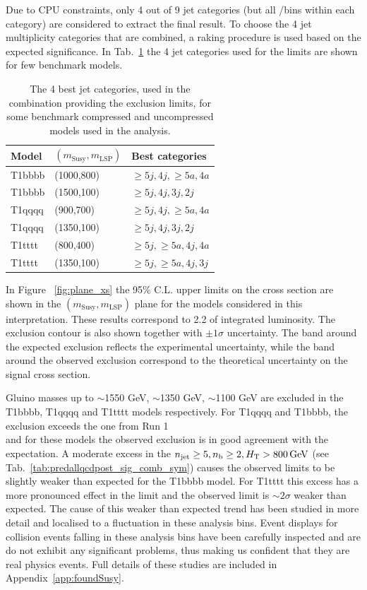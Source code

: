 Due to CPU constraints, only 4 out of 9 jet categories (but all \nb/\scalht bins
within each category) are considered to extract the final result. 
To choose the 4 jet multiplicity categories that are combined, a raking procedure 
is used based on the expected significance. 
In Tab.~\ref{tab:sig-bestCats} the 4 jet categories used for the limits are shown for few benchmark models. 

\begin{table}[h!]
  \caption{
    The 4 best jet categories, used in the combination providing the exclusion limits, 
    for some benchmark compressed and uncompressed models used in the analysis.
  }
  \label{tab:sig-bestCats}
  \centering
  \begin{tabular}{ lll }
    \hline
    \hline
    Model & $(m_{\mathrm{Susy}},m_{\mathrm{LSP}})$ & Best categories \\ 
    \hline
    T1bbbb & (1000,800) & $\geq5j,4j,\geq5a,4a$ \\
    T1bbbb & (1500,100) & $\geq5j,4j,3j,2j$ \\
    T1qqqq & (900,700)  & $\geq5j,4j,\geq5a,4a$ \\
    T1qqqq & (1350,100)  & $\geq5j,4j,3j,2j$ \\
    T1tttt & (800,400) & $\geq5j,\geq5a,4j,4a$ \\
    T1tttt & (1350,100) & $\geq5j,\geq5a,4j,3j$ \\
    \hline
    \hline
  \end{tabular}
\end{table}

In Figure ~\ref{fig:plane_xs} the 95\% C.L. upper limits on the cross section are shown 
in the $(m_{\mathrm{Susy}},m_{\mathrm{LSP}})$ plane for the models considered in this interpretation. 
These results correspond to 2.2 \ifb of integrated luminosity. 
The exclusion contour is also shown together with $\pm1\sigma$ uncertainty. 
The band around the expected exclusion reflects the experimental uncertainty, 
while the band around the observed exclusion correspond to the theoretical 
uncertainty on the signal cross section.

Gluino masses up to $\sim$1550 GeV, $\sim$1350 GeV, $\sim$1100 GeV are excluded in the T1bbbb, 
T1qqqq and T1tttt models respectively. 
For T1qqqq and T1bbbb, the exclusion exceeds the one from Run 1 \\
and for these models the observed exclusion is in good agreement with the expectation. 
A moderate excess in the $\njet\geq5, \nb\geq2, \scalht > 800 \, \mathrm{GeV}$ (see Tab.~\ref{tab:predallqcdpost_sig_comb_sym})
causes the observed limits to be slightly weaker than expected for the T1bbbb model. 
For T1tttt this excess has a more pronounced effect in the limit and the observed limit is $\sim 2\sigma$ 
weaker than expected. The cause of this weaker than expected trend has been studied in more detail
and localised to a fluctuation in these analysis bins. Event displays for collision events 
falling in these analysis bins have been carefully inspected and are do not exhibit any 
significant problems, thus making us confident that they are real physics events. Full details
of these studies are included in Appendix~\ref{app:foundSusy}.

